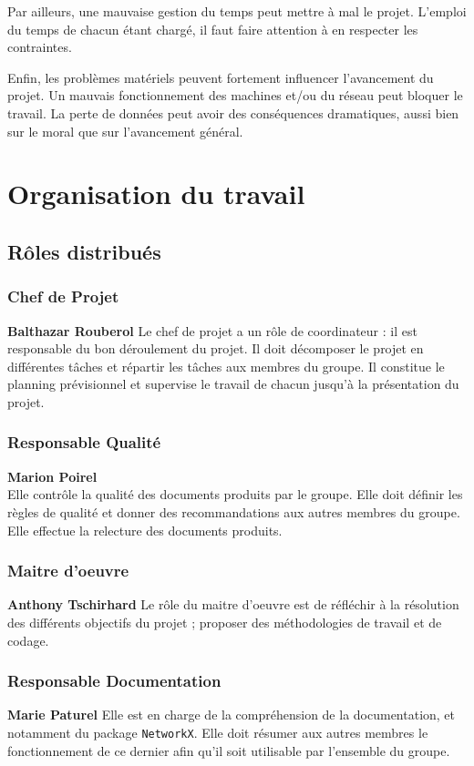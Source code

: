 Par ailleurs, une mauvaise gestion du temps peut mettre à mal le projet. L'emploi du temps de chacun étant chargé, il faut faire attention à en respecter les contraintes.

Enfin, les problèmes matériels peuvent fortement influencer l'avancement du projet. Un mauvais fonctionnement des machines et/ou du réseau peut bloquer le travail. La perte de données peut avoir des conséquences dramatiques, aussi bien sur le moral que sur l'avancement général.

\section{Organisation du travail}
\subsection{Rôles distribués}

\subsubsection{Chef de Projet}
\textbf{Balthazar Rouberol}
Le chef de projet a un rôle de coordinateur : il est responsable du bon déroulement du projet. Il doit décomposer le projet en différentes tâches et répartir les tâches aux membres du groupe. Il constitue le planning prévisionnel et supervise le travail de chacun jusqu'à la présentation du projet.
  
\subsubsection{Responsable Qualité}
\textbf{Marion Poirel}\\
Elle contrôle la qualité des documents produits par le groupe. Elle doit définir les règles de qualité et donner des recommandations aux autres membres du groupe. Elle effectue la relecture des documents produits.

\subsubsection{Maitre d'oeuvre}
\textbf{Anthony Tschirhard}
Le rôle du maitre d'oeuvre est de réfléchir à la résolution des différents objectifs du projet ; proposer des méthodologies de travail et de codage.

\subsubsection{Responsable Documentation}
\textbf{Marie Paturel}
Elle est en charge de la compréhension de la documentation, et notamment du package \verb?NetworkX?. Elle doit résumer aux autres membres le fonctionnement de ce dernier afin qu'il soit utilisable par l'ensemble du groupe.

